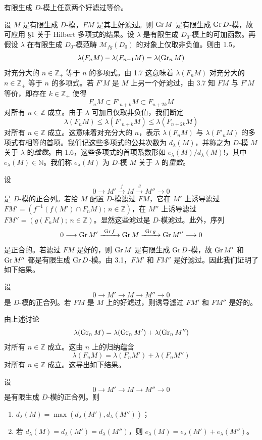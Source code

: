\begin{corollary}
有限生成 $D$-模上任意两个好滤过等价。
\end{corollary}

设 $M$ 是有限生成 $D$-模，$F M$ 是其上好滤过。则 $\operatorname{Gr} M$ 是有限生成 $\operatorname{Gr} D$-模，故可应用 §1 关于 Hilbert 多项式的结果。设 $\lambda$ 是有限生成 $D_0$-模上的可加函数。再假设 $\lambda$ 在有限生成 $D_0$-模范畴 $\mathcal{M}_{fg}(D_0)$ 的对象上仅取非负值。则由 1.5，
$$\lambda(F_n M)-\lambda(F_{n-1}M)=\lambda(\operatorname{Gr}_n M)$$
对充分大的 $n\in\mathbb{Z}_+$ 等于 $n$ 的多项式。由 1.7 这意味着 $\lambda(F_n M)$ 对充分大的 $n\in\mathbb{Z}_+$ 等于 $n$ 的多项式。若 $F'M$ 是 $M$ 上另一个好滤过，由 3.7 知 $F M$ 与 $F'M$ 等价，即存在 $k\in\mathbb{Z}_+$ 使得
$$F_n M\subset F'_{n+k}M\subset F_{n+2k}M$$
对所有 $n\in\mathbb{Z}$ 成立。由于 $\lambda$ 可加且仅取非负值，我们断定
$$\lambda(F_n M)\le\lambda(F'_{n+k}M)\le\lambda(F_{n+2k}M)$$
对所有 $n\in\mathbb{Z}$ 成立。这意味着对充分大的 $n$，表示 $\lambda(F_n M)$ 与 $\lambda(F'_n M)$ 的多项式有相等的首项。我们记这些多项式的公共次数为 $d_\lambda(M)$，并称之为 $D$-模 $M$ 关于 $\lambda$ 的\emph{维数}。由 1.6，这些多项式的首项系数形如 $e_\lambda(M)/d_\lambda(M)!$，其中 $e_\lambda(M)\in\mathbb{N}$。我们称 $e_\lambda(M)$ 为 $D$-模 $M$ 关于 $\lambda$ 的\emph{重数}。

设
$$0\longrightarrow M'\xrightarrow{\ f\ }M\xrightarrow{\ g\ }M''\longrightarrow 0$$
是 $D$-模的正合列。若给 $M$ 配置 $D$-模滤过 $F M$，它在 $M'$ 上诱导滤过 $F M'=(f^{-1}(f(M')\cap F_n M);\ n\in\mathbb{Z})$，在 $M''$ 上诱导滤过 $F M''=(g(F_n M);\ n\in\mathbb{Z})$。显然这些滤过是 $D$-模滤过。此外，序列
$$0\longrightarrow \operatorname{Gr} M'\xrightarrow{\ \operatorname{Gr} f\ }\operatorname{Gr} M\xrightarrow{\ \operatorname{Gr} g\ }\operatorname{Gr} M''\longrightarrow 0$$
是正合的。若滤过 $F M$ 是好的，则 $\operatorname{Gr} M$ 是有限生成 $\operatorname{Gr} D$-模，故 $\operatorname{Gr} M'$ 和 $\operatorname{Gr} M''$ 都是有限生成 $\operatorname{Gr} D$-模。由 3.1，$F M'$ 和 $F M''$ 是好滤过。因此我们证明了如下结果。

\begin{lemma}
设
$$0\longrightarrow M'\longrightarrow M\longrightarrow M''\longrightarrow 0$$
是 $D$-模的正合列。若 $F M$ 是 $M$ 上的好滤过，则诱导滤过 $F M'$ 和 $F M''$ 是好的。
\end{lemma}

由上述讨论
$$\lambda(\operatorname{Gr}_n M)=\lambda(\operatorname{Gr}_n M')+\lambda(\operatorname{Gr}_n M'')$$
对所有 $n\in\mathbb{Z}$ 成立。这由 $n$ 上的归纳蕴含
$$\lambda(F_n M)=\lambda(F_n M')+\lambda(F_n M'')$$
对所有 $n\in\mathbb{Z}$ 成立。这导出如下结果。

\begin{proposition}
设
$$0\longrightarrow M'\longrightarrow M\longrightarrow M''\longrightarrow 0$$
是有限生成 $D$-模的正合列。则
\begin{enumerate}[label=(\roman*)]
  \item $d_\lambda(M)=\max(d_\lambda(M'),d_\lambda(M''))$；
  \item 若 $d_\lambda(M)=d_\lambda(M')=d_\lambda(M'')$，则 $e_\lambda(M)=e_\lambda(M')+e_\lambda(M'')$。
\end{enumerate}
\end{proposition}

